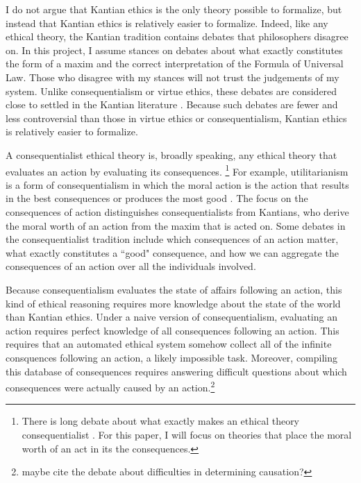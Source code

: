 \begin{isabellebody}
\begin{isamarkuptext}
I do not argue that Kantian ethics is the only theory possible to formalize, but instead that Kantian
ethics is relatively easier to formalize. Indeed, like any ethical theory, the Kantian tradition contains 
debates that philosophers disagree on. In this project, I assume stances on debates about
what exactly constitutes the form of a maxim and the correct interpretation of the Formula of 
Universal Law. Those who disagree with my stances will not trust the judgements of my system. Unlike
consequentialism or virtue ethics, these debates are considered close to settled in the Kantian literature 
\cite{ebelsduggan}. Because such debates are fewer and less controversial than those in virtue ethics
or consequentialism, Kantian ethics is relatively easier to formalize.%
\end{isamarkuptext}\isamarkuptrue%
%
\isadelimdocument
%
\endisadelimdocument
%
\isatagdocument
%
\isamarkuptrue%
%
\endisatagdocument
{\isafolddocument}%
%
\isadelimdocument
%
\endisadelimdocument
%
\begin{isamarkuptext}%
A consequentialist ethical theory is, broadly speaking, any ethical theory that evaluates an action by evaluating 
its consequences. \footnote{There is long debate about what exactly makes an ethical theory consequentialist \cite{consequentialismsep}. 
For this paper, I will focus on theories that place the moral worth of an act in its the consequences.} For example, 
utilitarianism is a form of consequentialism in which the moral action 
is the action that results in the best consequences or produces the most good \cite{utilsep}. The focus
on the consequences of action distinguishes consequentialists from Kantians, who derive the moral worth
of an action from the maxim that is acted on. Some debates in the consequentialist tradition include 
which consequences of an action matter, what exactly constitutes a ``good" consequence, and how we can 
aggregate the consequences of an action over all the individuals involved.%
\end{isamarkuptext}\isamarkuptrue%
%
\isadelimdocument
%
\endisadelimdocument
%
\isatagdocument
%
\isamarkuptrue%
%
\endisatagdocument
{\isafolddocument}%
%
\isadelimdocument
%
\endisadelimdocument
%
\begin{isamarkuptext}%
Because consequentialism evaluates the state of affairs following an action, this kind of ethical 
reasoning requires more knowledge
about the state of the world than Kantian ethics. Under a naive version of consequentialism, evaluating 
an action requires perfect knowledge of all consequences following an action. This requires that an 
automated ethical system somehow collect all of the infinite consquences following an action, a likely
impossible task. Moreover, compiling this database of consequences requires 
answering difficult questions about which consequences were actually caused by an action.\footnote
{maybe cite the debate about difficulties in determining causation?}


\end{isamarkuptext}
\end{isabellebody}
